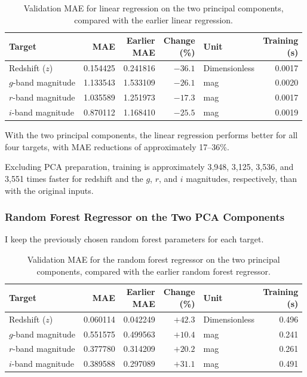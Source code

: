\documentclass[12pt,a4paper]{article}
\begin{document}
\begin{table}[htbp]
\centering
\small
\setlength{\tabcolsep}{3pt}
\caption{Validation MAE for linear regression on the two principal components, compared with the earlier linear regression.}
\label{tab:pca-linear-validation}
\begin{tabular}{lrrrlr}
\toprule
Target & MAE & \shortstack{Earlier\\MAE} & \shortstack{Change\\(\%)} & Unit & \shortstack{Training\\(s)} \\
\midrule
Redshift ($z$) & 0.154425 & 0.241816 & $-36.1$ & Dimensionless & 0.0017 \\
$g$-band magnitude & 1.133543 & 1.533109 & $-26.1$ & mag & 0.0020 \\
$r$-band magnitude & 1.035589 & 1.251973 & $-17.3$ & mag & 0.0017 \\
$i$-band magnitude & 0.870112 & 1.168410 & $-25.5$ & mag & 0.0019 \\
\bottomrule
\end{tabular}
\end{table}

With the two principal components, the linear regression performs better for all four targets, with MAE reductions of approximately 17--36\%.

Excluding PCA preparation, training is approximately 3,948, 3,125, 3,536, and 3,551 times faster for redshift and the $g$, $r$, and $i$ magnitudes, respectively, than with the original inputs.

\subsubsection{Random Forest Regressor on the Two PCA Components}

I keep the previously chosen random forest parameters for each target.

\begin{table}[htbp]
\centering
\small
\setlength{\tabcolsep}{3pt}
\caption{Validation MAE for the random forest regressor on the two principal components, compared with the earlier random forest regressor.}
\label{tab:pca-forest-validation}
\begin{tabular}{lrrrlr}
\toprule
Target & MAE & \shortstack{Earlier\\MAE} & \shortstack{Change\\(\%)} & Unit & \shortstack{Training\\(s)} \\
\midrule
Redshift ($z$) & 0.060114 & 0.042249 & $+42.3$ & Dimensionless & 0.496 \\
$g$-band magnitude & 0.551575 & 0.499563 & $+10.4$ & mag & 0.241 \\
$r$-band magnitude & 0.377780 & 0.314209 & $+20.2$ & mag & 0.261 \\
$i$-band magnitude & 0.389588 & 0.297089 & $+31.1$ & mag & 0.491 \\
\bottomrule
\end{tabular}
\end{table}
\end{document}
